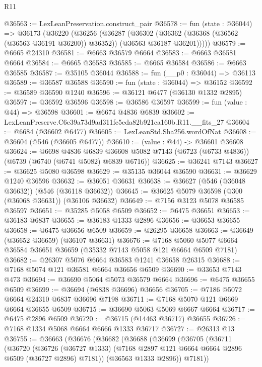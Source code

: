 \begin{lexlean}{R11}
\begin{coremodule}
@36563 := LexLeanPreservation.construct_pair
@36578 := fun (state : @36044) =>
  @36173
    (@36220
      (@36256
        (@36287
          (@36302
            (@36362 (@36368 (@36562 (@36563 @36191 @36200)) @36352))
            (@36563 @36187 @36201)))))
@36579 := @6665 @24310
@36581 := @6663 @36579 @6664
@36583 := @6663 @36581 @6664
@36584 := @6665 @36583
@36585 := @6665 @36584
@36586 := @6663 @36585
@36587 := @35105 @36044
@36588 := fun (__p0 : @36044) => @36113
@36589 := @36587 @36588
@36590 := fun (state : @36044) => @36152
@36592 := @36589 @36590 @1240
@36596 := @36121 @6477 (@36130 @1332 @2895)
@36597 := @36592 @36596
@36598 := @36586 @36597
@36599 := fun (value : @44) => @36598
@36601 := @6674 @4836 @6839
@36602 := LexLeanPreserve.C6e39a73d9ad311fe5eda82b921ca160b.R11.__fits_27
@36604 := @6684 (@36602 @6477)
@36605 := LexLeanStd.Sha256.wordOfNat
@36608 := @36604 (@546 (@36605 @6477))
@36610 := (value : @44) -> @36601 @36608
@36624 := @6698
    @4836
    @6839
    @36608
    @5082
    @7143
    (@6723 (@6733 @4836))
    (@6739 (@6740 (@6741 @5082) @6839 @6716))
@36625 := @36241 @7143
@36627 := @36625 @5080 @36598
@36629 := @35135 @36044 @36590
@36631 := @36629 @1240 @36596
@36632 := @36051 @36631
@36638 := @36627 (@546 (@36048 @36632)) (@546 (@36118 @36632))
@36645 := @36625 @5079 @36598 (@300 (@36068 @36631)) (@36106 @36632)
@36649 := @7156 @3123 @5078 @36585 @36597
@36651 := @35285 @5058 @6509
@36652 := @6475 @36651
@36653 := @36183 @6837
@36655 := @36183 @1333 @2896
@36656 := @36653 @36655
@36658 := @6475 @36656 @6509
@36659 := @26295 @36658
@36663 := @36649 (@36652 @36659) (@36107 @36631)
@36676 := @7168 @5060 @5077 @6664 @36584 @36651 @36659 (@35332 @7143 @5058 @121 @6664 @6509 @7181)
@36682 := @26307 @5076 @6664 @36583 @1241 @36658 @26315
@36688 := @7168 @5074 @121 @36581 @6664 @36656 @6509
@36690 := @33653 @7143 @473
@36694 := @36690 @5064 @5073 @36579 @6664
@36696 := @6475 @36655 @6509
@36699 := @36694 (@6838 @36696) @36656
@36705 := @7186 @5072 @6664 @24310 @6837 @36696 @7198
@36711 := @7168 @5070 @121 @6669 @6664 @36655 @6509
@36715 := @36690 @5063 @5069 @6667 @6664
@36717 := @6475 @2896 @6509
@36720 := @36715 (@14463 @36717) @36655
@36726 := @7168 @1334 @5068 @6664 @6666 @1333 @36717
@36727 := @26313 @13
@36755 := @36663
    (@36676
      (@36682
        (@36688
          (@36699
            (@36705
              (@36711
                (@36720
                  (@36726
                    (@36727 @1333)
                    (@7168 @2897 @121 @6664 @6664 @2896 @6509 (@36727 @2896) @7181))
                  (@36563 @1333 @2896))
                @7181))

\end{coremodule}
\end{lexlean}
